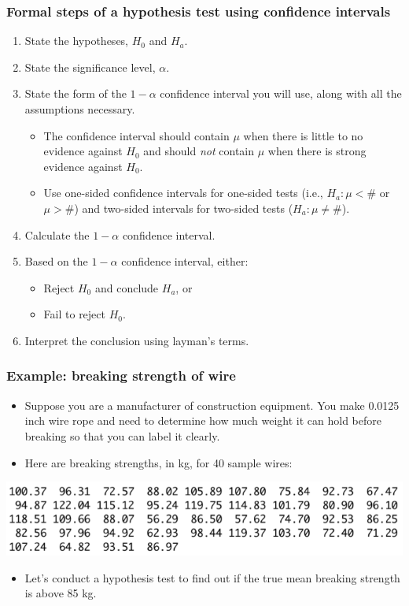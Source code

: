 \documentclass[handout]{beamer}\usepackage[]{graphicx}\usepackage[]{color}
\numberwithin{equation}{section}
\begin{document}
\begin{frame}
\frametitle{Formal steps of a hypothesis test using confidence intervals}
\begin{enumerate}[1. ]
\item State the hypotheses, $H_0$ and $H_a$.
\pause \item State the significance level, $\alpha$.
\pause \item State the form of the $1 - \alpha$ confidence interval you will use, along with all the assumptions necessary. 
\begin{itemize}
\item The confidence interval should contain $\mu$ when there is little to no evidence against $H_0$ and should \emph{not} contain $\mu$ when there is strong evidence against $H_0$. 
\item Use one-sided confidence intervals for one-sided tests (i.e., $H_a: \mu < \#$ or $\mu > \#$) and two-sided intervals for two-sided tests ($H_a: \mu \ne \#$).
\end{itemize}
\pause \item Calculate the $1 - \alpha$ confidence interval.
\pause \item Based on the $1 - \alpha$ confidence interval, either:
\begin{itemize}
\pause \item Reject $H_0$ and conclude $H_a$, or
\pause \item Fail to reject $H_0$.
\end{itemize}
\pause \item Interpret the conclusion using layman's terms.
\end{enumerate}
\end{frame}


\begin{frame}
\frametitle{Example: breaking strength of wire}
\begin{itemize}
\item Suppose you are a manufacturer of construction equipment. You make 0.0125 inch wire rope and need to determine how much weight it can hold before breaking so that you can label it clearly.
\pause \item Here are breaking strengths, in kg, for 40 sample wires:
\end{itemize}
 \includegraphics{../../fig/wiredata.png}
\begin{itemize}
\pause \item Let's conduct a hypothesis test to find out if the true mean breaking strength is above 85 kg.
\end{itemize}
\end{frame}
\end{document}
